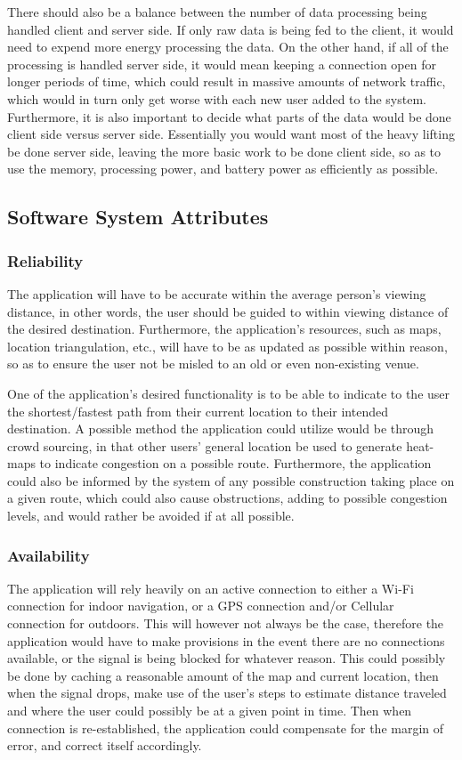 \documentclass[12pt]{article}
\begin{document}
	There should also be a balance between the number of data processing being handled client and server side.  If only raw data is being fed to the client, it would need to expend more energy processing the data.  On the other hand, if all of the processing is handled server side, it would mean keeping a connection open for longer periods of time, which could result in massive amounts of network traffic, which would in turn only get worse with each new user added to the system.  Furthermore, it is also important to decide what parts of the data would be done client side versus server side.  Essentially you would want most of the heavy lifting be done server side, leaving the more basic work to be done client side, so as to use the memory, processing power, and battery power as efficiently as possible.   
	
	
	\subsection{Software System Attributes}
	
		\subsubsection{Reliability}
		The application will have to be accurate within the average person’s viewing distance, in other words, the user should be guided to within viewing distance of the desired destination.  Furthermore, the application’s resources, such as maps, location triangulation, etc., will have to be as updated as possible within reason, so as to ensure the user not be misled to an old or even non-existing venue.  
		
		One of the application’s desired functionality is to be able to indicate to the user the shortest/fastest path from their current location to their intended destination.  A possible method the application could utilize would be through crowd sourcing, in that other users’ general location be used to generate heat-maps to indicate congestion on a possible route.  Furthermore, the application could also be informed by the system of any possible construction taking place on a given route, which could also cause obstructions, adding to possible congestion levels, and would rather be avoided if at all possible.  
		
		\subsubsection{Availability}
		The application will rely heavily on an active connection to either a Wi-Fi connection for indoor navigation, or a GPS connection and/or Cellular connection for outdoors.  This will however not always be the case, therefore the application would have to make provisions in the event there are no connections available, or the signal is being blocked for whatever reason.  This could possibly be done by caching a reasonable amount of the map and current location, then when the signal drops, make use of the user’s steps to estimate distance traveled and where the user could possibly be at a given point in time.  Then when connection is re-established, the application could compensate for the margin of error, and correct itself accordingly.  
		
\end{document}

